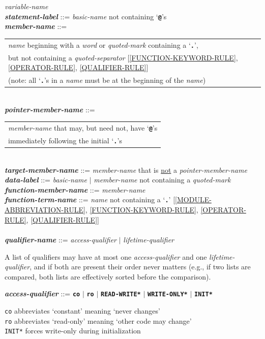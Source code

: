 \documentclass[12pt]{article}
\newcommand{\TT}[1]{{\tt \bfseries #1}}
\newcommand{\ttkey}[1]{{\tt \bfseries #1}}
\newcommand{\emkey}[1]{{\em \bfseries #1}}
\newcommand{\ttakey}[1]{{\tt \bfseries *#1*}}
\newenvironment{indpar}[1][0.3in]%
	{\begin{list}{}%
		     {\setlength{\itemsep}{0in}%
		      \setlength{\topsep}{0in}%
		      \setlength{\parsep}{1ex}%
		      \setlength{\labelwidth}{#1}%
		      \setlength{\leftmargin}{#1}%
		      \addtolength{\leftmargin}{\labelsep}}%
	 \item}%
	{\end{list}}
\begin{document}
\begin{indpar}
    {\em variable-name} \\
\emkey{statement-label} ::= {\em basic-name}
    \label{STATEMENT-LABEL} not containing `\TT{@}'s
\\[1ex]
\emkey{member-name}\label{MEMBER-NAME}
	::= \begin{tabular}[t]{@{}l@{}}
                        {\em name} beginning with a {\em word} or
			{\em quoted-mark} containing a `\TT{.}', \\
			but not containing a {\em quoted-separator}
			[\ref{FUNCTION-KEYWORD-RULE},
			 \ref{OPERATOR-RULE},
			 \ref{QUALIFIER-RULE}] \\
			(note: all `\TT{.}'s in a {\em name} must be at
			 the beginning of the {\em name})
			\end{tabular} \\
\emkey{pointer-member-name}\label{POINTER-MEMBER-NAME} ::=
    \begin{tabular}[t]{@{}l@{}}
    {\em member-name} that may, but need not, have `\TT{@}'s \\
    immediately following the initial `\TT{.}'s \\
    \end{tabular} \\
\emkey{target-member-name}\label{TARGET-MEMBER-NAME} ::=
    {\em member-name} that is \underline{not} a {\em pointer-member-name}
\\[1ex]
\emkey{data-label}\label{DATA-LABEL} ::=
    {\em basic-name} $|$ {\em member-name} not containing a {\em quoted-mark}
\\[1ex]
\emkey{function-member-name}\label{FUNCTION-MEMBER-NAME} ::=
    {\em member-name} \\
\emkey{function-term-name} ::= {\em name} not containing a `\TT{.}'
    \label{FUNCTION-TERM-NAME}
	[\ref{MODULE-ABBREVIATION-RULE},
	 \ref{FUNCTION-KEYWORD-RULE},
	 \ref{OPERATOR-RULE},
	 \ref{QUALIFIER-RULE}] \\
\\[1ex]
\emkey{qualifier-name}\label{QUALIFIER-NAME}
    ::= {\em access-qualifier} $|$ {\em lifetime-qualifier}
\begin{indpar}
A list of qualifiers may have at most one {\em access-qualifier}
and one {\em lifetime-qualifier}, and if both are present their
order never matters (e.g., if two lists are compared, both lists
are effectively sorted before the comparison).
\end{indpar}

\emkey{access-qualifier}\label{ACCESS-QUALIFIER}
    ::= \ttkey{co} $|$ \ttkey{ro} $|$ \ttakey{READ-WRITE}
                   $|$ \ttakey{WRITE-ONLY} $|$ \ttakey{INIT}
\begin{indpar}
{\tt co} abbreviates `constant' meaning `never changes' \\
{\tt ro} abbreviates `read-only' meaning `other code may change' \\
{\tt *INIT*} forces write-only during initialization
\end{indpar}


\end{indpar}
\end{document}
